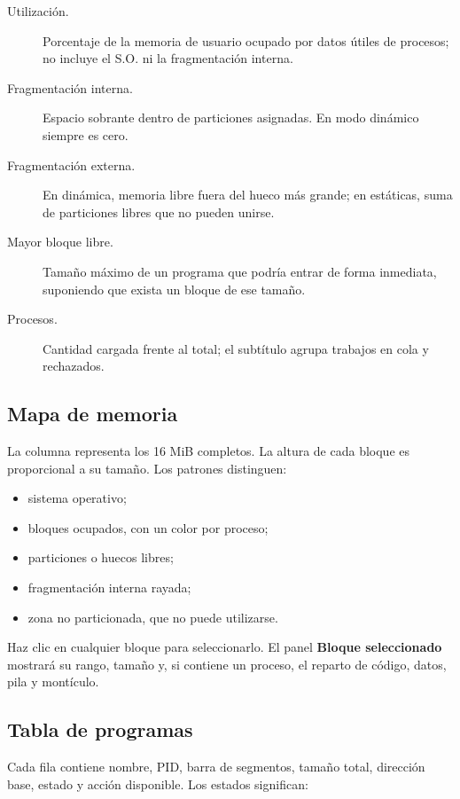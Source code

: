 \documentclass[11pt,a4paper]{article}
\newcommand{\control}[1]{\textsf{\textbf{#1}}}
\begin{document}
\begin{description}
  \item[Utilización.] Porcentaje de la memoria de usuario ocupado por datos útiles
  de procesos; no incluye el S.O. ni la fragmentación interna.
  \item[Fragmentación interna.] Espacio sobrante dentro de particiones asignadas.
  En modo dinámico siempre es cero.
  \item[Fragmentación externa.] En dinámica, memoria libre fuera del hueco más
  grande; en estáticas, suma de particiones libres que no pueden unirse.
  \item[Mayor bloque libre.] Tamaño máximo de un programa que podría entrar de
  forma inmediata, suponiendo que exista un bloque de ese tamaño.
  \item[Procesos.] Cantidad cargada frente al total; el subtítulo agrupa trabajos
  en cola y rechazados.
\end{description}

\subsection{Mapa de memoria}

La columna representa los 16 MiB completos. La altura de cada bloque es
proporcional a su tamaño. Los patrones distinguen:

\begin{itemize}
  \item sistema operativo;
  \item bloques ocupados, con un color por proceso;
  \item particiones o huecos libres;
  \item fragmentación interna rayada;
  \item zona no particionada, que no puede utilizarse.
\end{itemize}

Haz clic en cualquier bloque para seleccionarlo. El panel \control{Bloque
seleccionado} mostrará su rango, tamaño y, si contiene un proceso, el reparto de
código, datos, pila y montículo.

\subsection{Tabla de programas}

Cada fila contiene nombre, PID, barra de segmentos, tamaño total, dirección base,
estado y acción disponible. Los estados significan:
\end{document}
